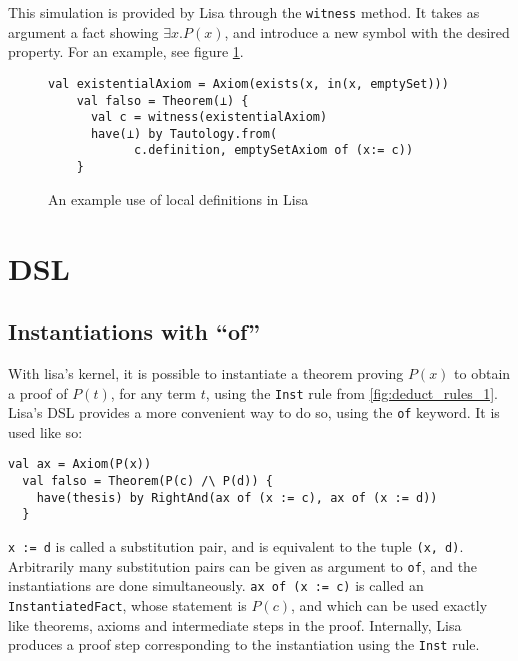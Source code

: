 This simulation is provided by Lisa through the \lstinline|witness|{} method. It takes as argument a fact showing $\exists x. P(x)$, and introduce a new symbol with the desired property. For an example, see figure \ref{fig:localDefinitionExample}.

\begin{figure}
  \begin{lstlisting}[language=lisa, frame=single]
    val existentialAxiom = Axiom(exists(x, in(x, emptySet)))
    val falso = Theorem(⊥) {
      val c = witness(existentialAxiom)
      have(⊥) by Tautology.from(
            c.definition, emptySetAxiom of (x:= c))
    }
  \end{lstlisting}
  \caption{An example use of local definitions in Lisa}
  \label{fig:localDefinitionExample}
  \end{figure}


\section{DSL}

\subsection{Instantiations with ``of''}

With lisa's kernel, it is possible to instantiate a theorem proving $P(x)$ to obtain a proof of $P(t)$, for any term $t$, using the \texttt{Inst} rule from \autoref{fig:deduct_rules_1}. Lisa's DSL provides a more convenient way to do so, using the \lstinline|of| keyword. It is used like so:
\begin{lstlisting}[language=lisa, frame=single]
  val ax = Axiom(P(x))
  val falso = Theorem(P(c) /\ P(d)) {
    have(thesis) by RightAnd(ax of (x := c), ax of (x := d))
  }
\end{lstlisting}
\lstinline|x := d| is called a substitution pair, and is equivalent to the tuple \lstinline|(x, d)|. Arbitrarily many substitution pairs can be given as argument to \lstinline|of|, and the instantiations are done simultaneously. \lstinline|ax of (x := c)| is called an \lstinline|InstantiatedFact|, whose statement is $P(c)$, and which can be used exactly like theorems, axioms and intermediate steps in the proof. Internally, Lisa produces a proof step corresponding to the instantiation using the \texttt{Inst} rule.

